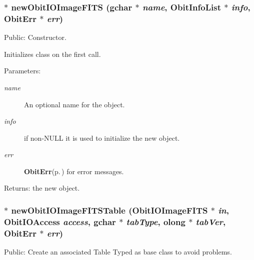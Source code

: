 \subsubsection{$\ast$ new\-Obit\-IOImage\-FITS (gchar $\ast$ {\em name}, {\bf Obit\-Info\-List} $\ast$ {\em info}, {\bf Obit\-Err} $\ast$ {\em err})}\label{ObitIOImageFITS_8h_a4}


Public: Constructor. 

Initializes class on the first call. \begin{Desc}
\item[Parameters:]
\begin{description}
\item[{\em name}]An optional name for the object. \item[{\em info}]if non-NULL it is used to initialize the new object. \item[{\em err}]{\bf Obit\-Err}{\rm (p.\,\pageref{structObitErr})} for error messages. \end{description}
\end{Desc}
\begin{Desc}
\item[Returns:]the new object. \end{Desc}
\subsubsection{$\ast$ new\-Obit\-IOImage\-FITSTable ({\bf Obit\-IOImage\-FITS} $\ast$ {\em in}, Obit\-IOAccess {\em access}, gchar $\ast$ {\em tab\-Type}, {\bf olong} $\ast$ {\em tab\-Ver}, {\bf Obit\-Err} $\ast$ {\em err})}\label{ObitIOImageFITS_8h_a20}


Public: Create an associated Table Typed as base class to avoid problems. 

